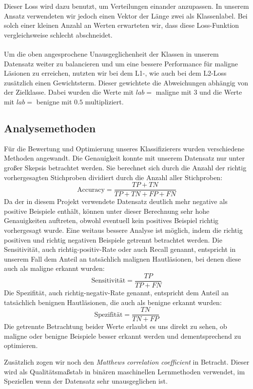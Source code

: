 	Dieser Loss wird dazu benutzt, um Verteilungen einander anzupassen. In unserem Ansatz verwendeten wir jedoch einen Vektor der Länge zwei als Klassenlabel. Bei solch einer kleinen Anzahl an Werten erwarteten wir, dass diese Loss-Funktion vergleichsweise schlecht abschneidet.
\\
\\
Um die oben angesprochene Unausgeglichenheit der Klassen in unserem Datensatz weiter zu balancieren und um eine bessere Performance für maligne Läsionen zu erreichen, nutzten wir bei dem L1-, wie auch bei dem L2-Loss zusätzlich einen Gewichtsterm. Dieser gewichtete die Abweichungen abhängig von der Zielklasse. Dabei wurden die Werte mit $lab=$ maligne mit $3$ und die Werte mit $lab=$ benigne mit $0.5$ multipliziert. 
	  

\subsection{Analysemethoden}
\label{analysemethoden}

Für die Bewertung und Optimierung unseres Klassifizierers wurden verschiedene Methoden angewandt. Die Genauigkeit konnte mit unserem Datensatz nur unter großer Skepsis betrachtet werden. Sie berechnet sich durch die Anzahl der richtig vorhergesagten Stichproben dividiert durch die Anzahl aller Stichproben:
	\[\text{Accuracy} = \frac{TP+TN}{TP+TN+FP+FN}\]
Da der in diesem Projekt verwendete Datensatz deutlich mehr negative als positive Beispiele enthält, können unter dieser Berechnung sehr hohe Genauigkeiten auftreten, obwohl eventuell kein positives Beispiel richtig vorhergesagt wurde.
Eine weitaus bessere Analyse ist möglich, indem die richtig positiven und richtig negativen Beispiele getrennt betrachtet werden. Die Sensitivität, auch richtig-positiv-Rate oder auch Recall genannt, entspricht in unserem Fall dem Anteil an tatsächlich malignen Hautläsionen, bei denen diese auch als maligne erkannt wurden:
\[\text{Sensitivität} = \frac{TP}{TP+FN}\]
Die Spezifität, auch richtig-negativ-Rate genannt, entspricht dem Anteil an tatsächlich benignen Hautläsionen, die auch als benigne erkannt wurden:
\[\text{Spezifität} = \frac{TN}{TN+FP}\]
Die getrennte Betrachtung beider Werte erlaubt es uns direkt zu sehen, ob maligne oder benigne Beispiele besser erkannt werden und dementsprechend zu optimieren.

Zusätzlich zogen wir noch den \textit{Matthews correlation coefficient} in Betracht. Dieser wird als Qualitätsmaßstab in binären maschinellen Lernmethoden verwendet, im Speziellen wenn der Datensatz sehr unausgeglichen ist. 

